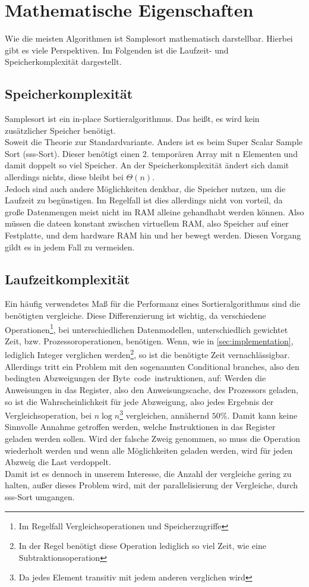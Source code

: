 \section{Mathematische Eigenschaften}
	Wie die meisten Algorithmen ist Samplesort mathematisch darstellbar.
	Hierbei gibt es viele Perspektiven.
	Im Folgenden ist die Laufzeit- und Speicherkomplexität dargestellt.
	
	\subsection{Speicherkomplexität}
		Samplesort ist ein in-place Sortieralgorithmus.
		Das heißt, es wird kein zusätzlicher Speicher benötigt.\\
		Soweit die Theorie zur Standardvariante.
		Anders ist es beim Super Scalar Sample Sort (sss-Sort). \autocite{sanders-2004} 
		Dieser benötigt einen 2. temporären Array mit n Elementen und damit doppelt so viel Speicher.
		An der Speicherkomplexität ändert sich damit allerdings nichts, diese bleibt bei $\Theta(n)$.\\
		Jedoch sind auch andere Möglichkeiten denkbar, die Speicher nutzen, um die Laufzeit zu begünstigen.
		Im Regelfall ist dies allerdings nicht von vorteil, da große Datenmengen meist nicht im RAM alleine gehandhabt werden können.
		Also müssen die dateen konstant zwischen virtuellem RAM, also Speicher auf einer Festplatte, und dem hardware RAM hin und her bewegt werden.
		Diesen Vorgang gildt es in jedem Fall zu vermeiden.

	\subsection{Laufzeitkomplexität}
		Ein häufig verwendetes Maß für die Performanz eines Sortieralgorithmus sind die benötigten vergleiche.
		Diese Differenzierung ist wichtig, da verschiedene Operationen\footnote{Im Regelfall Vergleichsoperationen und Speicherzugriffe}, bei unterschiedlichen Datenmodellen, unterschiedlich gewichtet Zeit, bzw. Prozessoroperationen, benötigen.
		Wenn, wie in \ref{sec:implementation}, lediglich Integer verglichen werden\footnote{In der Regel benötigt diese Operation lediglich so viel Zeit, wie eine Subtraktionsoperation}, so ist die benötigte Zeit vernachlässigbar.
		Allerdings tritt ein Problem mit den sogenannten Conditional branches, also den bedingten Abzweigungen der Byte~code~instruktionen, auf:
		Werden die Anweisungen in das Register, also den Anweisungscache, des Prozessors geladen, so ist die Wahrscheinlichkeit für jede Abzweigung, also jedes Ergebnis der Vergleichsoperation, bei $n\log{n}$\footnote{Da jedes Element transitiv mit jedem anderen verglichen wird} vergleichen, annähernd $50\%$.
		Damit kann keine Sinnvolle Annahme getroffen werden, welche Instruktionen in das Register geladen werden sollen.
		Wird der falsche Zweig genommen, so muss die Operation wiederholt werden und wenn alle Möglichkeiten geladen werden, wird für jeden Abzweig die Last verdoppelt. \autocite{sanders-2004}\\
		Damit ist es dennoch in unserem Interesse, die Anzahl der vergleiche gering zu halten, außer dieses Problem wird, mit der parallelisierung der Vergleiche, durch sss-Sort umgangen.
		
